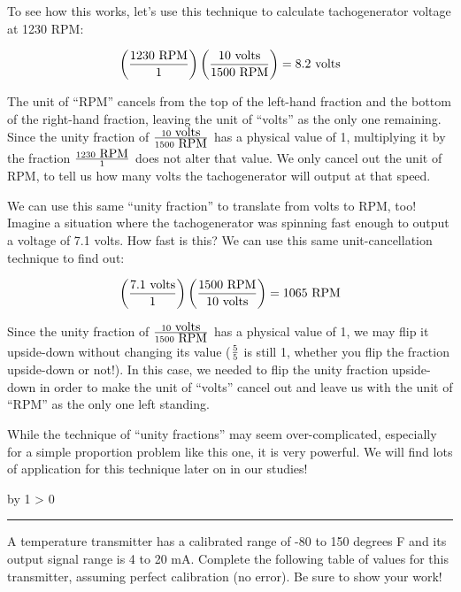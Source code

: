 \documentclass[12pt,a4paper]{article}
\def\oppgave{
            \advance\questnum by 1
            \ifnum \questnum > 0
                 \hrule
                 \vskip 3pt
                 \leftline{Oppgave \the\questnum}
                 \vskip 3pt \fi}
\begin{document}
To see how this works, let's use this technique to calculate tachogenerator voltage at 1230 RPM:

$$\left({1230 \hbox{ RPM} \over 1} \right)  \left( {10 \hbox{ volts} \over 1500 \hbox{ RPM}} \right) = 8.2 \hbox{ volts}$$

The unit of ``RPM'' cancels from the top of the left-hand fraction and the bottom of the right-hand fraction, leaving the unit of ``volts'' as the only one remaining.  Since the unity fraction of $10 \hbox{ volts} \over 1500 \hbox{ RPM}$ has a physical value of 1, multiplying it by the fraction $1230 \hbox{ RPM} \over 1$ does not alter that value.  We only cancel out the unit of RPM, to tell us how many volts the tachogenerator will output at that speed.

We can use this same ``unity fraction'' to translate from volts to RPM, too!  Imagine a situation where the tachogenerator was spinning fast enough to output a voltage of 7.1 volts.  How fast is this?  We can use this same unit-cancellation technique to find out:

$$\left({7.1 \hbox{ volts} \over 1} \right)  \left( 1500 \hbox{ RPM} \over {10 \hbox{ volts}} \right) = 1065 \hbox{ RPM}$$

Since the unity fraction of $10 \hbox{ volts} \over 1500 \hbox{ RPM}$ has a physical value of 1, we may flip it upside-down without changing its value ($5 \over 5$ is still 1, whether you flip the fraction upside-down or not!).  In this case, we needed to flip the unity fraction upside-down in order to make the unit of ``volts'' cancel out and leave us with the unit of ``RPM'' as the only one left standing.

\vskip 10pt

While the technique of ``unity fractions'' may seem over-complicated, especially for a simple proportion problem like this one, it is very powerful.  We will find lots of application for this technique later on in our studies!



\vfil \eject 



\oppgave{} 

A temperature transmitter has a calibrated range of -80 to 150 degrees F and its output signal range is 4 to 20 mA.  Complete the following table of values for this transmitter, assuming perfect calibration (no error).  Be sure to show your work!
\end{document}
